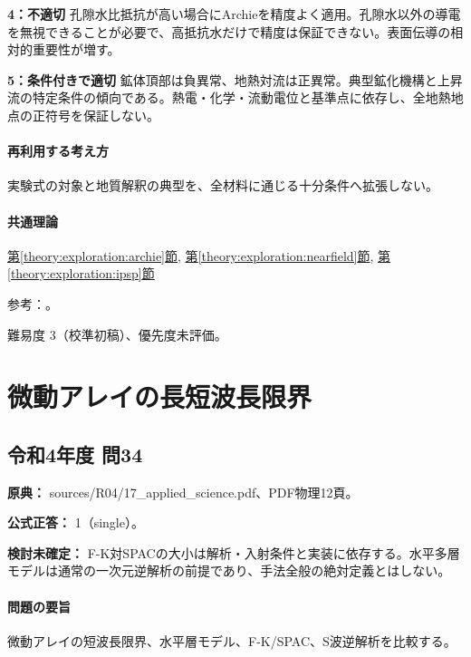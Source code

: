 \noindent\textbf{4：不適切} 孔隙水比抵抗が高い場合にArchieを精度よく適用。孔隙水以外の導電を無視できることが必要で、高抵抗水だけで精度は保証できない。表面伝導の相対的重要性が増す。\par

\noindent\textbf{5：条件付きで適切} 鉱体頂部は負異常、地熱対流は正異常。典型鉱化機構と上昇流の特定条件の傾向である。熱電・化学・流動電位と基準点に依存し、全地熱地点の正符号を保証しない。\par

\paragraph{再利用する考え方} 実験式の対象と地質解釈の典型を、全材料に通じる十分条件へ拡張しない。

\paragraph{共通理論} \hyperref[theory:exploration:archie]{第\ref*{theory:exploration:archie}節}, \hyperref[theory:exploration:nearfield]{第\ref*{theory:exploration:nearfield}節}, \hyperref[theory:exploration:ipsp]{第\ref*{theory:exploration:ipsp}節}

\par 参考：\cite{epa_borehole_resistivity,epa_resistivity,epa_sp,usgs_csamt2012}。

\par 難易度 3（校準初稿）、優先度未評価。

\section{微動アレイの長短波長限界}

\subsection{令和4年度 問34}
\label{q:r04-reg-applied-34}

\noindent\textbf{原典：} sources/R04/17\_applied\_science.pdf、PDF物理12頁。

\textbf{公式正答：} 1（single）。

\par\textbf{検討未確定：} F-K対SPACの大小は解析・入射条件と実装に依存する。水平多層モデルは通常の一次元逆解析の前提であり、手法全般の絶対定義とはしない。

\paragraph{問題の要旨} 微動アレイの短波長限界、水平層モデル、F-K/SPAC、S波逆解析を比較する。

